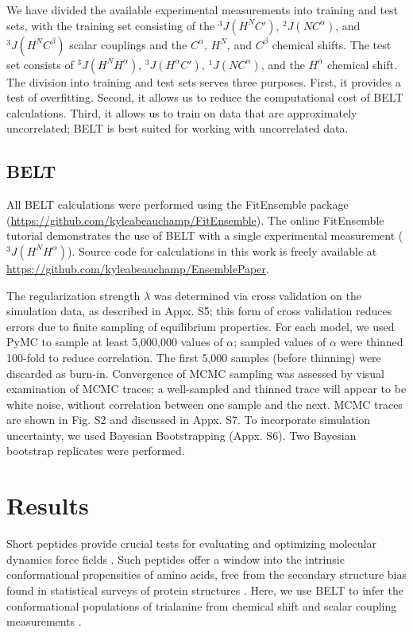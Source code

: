 \documentclass[journal=jacsat,manuscript=article]{achemso}
\begin{document}
We have divided the available experimental measurements into training and test sets, with the training set consisting of the $^3J(H^N C')$,  $^2J(N C^\alpha)$, and $^3J(H^N C^\beta)$ scalar couplings and the $C^\alpha$, $H^N$, and $C^\beta$ chemical shifts.  The test set consists of $^3J(H^N H^\alpha)$, $^3J(H^\alpha C')$, $^1J(N C^\alpha)$, and the $H^\alpha$ chemical shift.  The division into training and test sets serves three purposes.  First, it provides a test of overfitting.  Second, it allows us to reduce the computational cost of BELT calculations.  Third, it allows us to train on data that are approximately uncorrelated; BELT is best suited for working with uncorrelated data.  

\subsection*{BELT}

All BELT calculations were performed using the FitEnsemble package (\url{https://github.com/kyleabeauchamp/FitEnsemble}).  The online FitEnsemble tutorial demonstrates the use of BELT with a single experimental measurement ($^3J(H^N H^\alpha)$).  Source code for calculations in this work is freely available at \url{https://github.com/kyleabeauchamp/EnsemblePaper}.  

The regularization strength $\lambda$ was determined via cross validation on the simulation data, as described in Appx. S5; this form of cross validation reduces errors due to finite sampling of equilibrium properties.  For each model, we used PyMC to sample at least 5,000,000 values of $\alpha$; sampled values of $\alpha$ were thinned 100-fold to reduce correlation.  The first 5,000 samples (before thinning) were discarded as burn-in.  Convergence of MCMC sampling was assessed by visual examination of MCMC traces; a well-sampled and thinned trace will appear to be white noise, without correlation between one sample and the next.  MCMC traces are shown in Fig. S2 and discussed in Appx. S7.  To incorporate simulation uncertainty, we used Bayesian Bootstrapping (Appx. S6).  Two Bayesian bootstrap replicates were performed.  

\section*{Results}

Short peptides provide crucial tests for evaluating and optimizing molecular dynamics force fields  \cite{Graf2007,beauchamp2012protein, nerenberg2011, best2008, Grdadolnik2011}.  Such peptides offer a window into the intrinsic conformational propensities of amino acids, free from the secondary structure bias found in statistical surveys of protein structures  \cite{Jha2005}.  Here, we use BELT to infer the conformational populations of trialanine from chemical shift and scalar coupling measurements  \cite{Graf2007}.  
\end{document}
